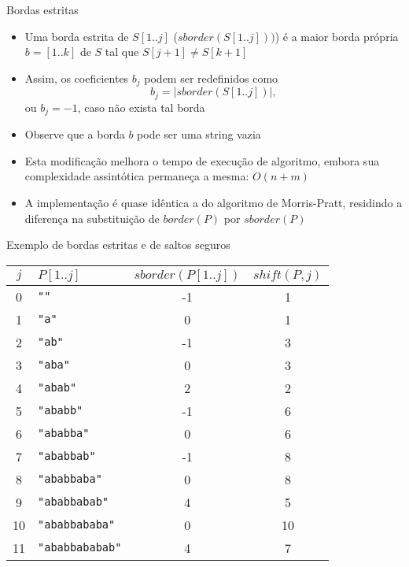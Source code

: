 \begin{frame}[fragile]{Bordas estritas}

    \begin{itemize}
        \item Uma borda estrita de $S[1..j]$ ($sborder(S[1..j]))$) é a maior borda própria 
            $b = [1..k]$ de $S$ tal que $S[j + 1] \neq S[k + 1]$

        \item Assim, os coeficientes $b_j$ podem ser redefinidos como
        \[
            b_j = |sborder(S[1..j])|,
        \]
        ou $b_j = -1$, caso não exista tal borda

        \item Observe que a borda $b$ pode ser uma string vazia

        \item Esta modificação melhora o tempo de execução de algoritmo, embora sua 
            complexidade assintótica permaneça a mesma: $O(n + m)$

        \item A implementação é quase idêntica a do algoritmo de Morris-Pratt, residindo a 
            diferença na substituição de $border(P)$ por $sborder(P)$

    \end{itemize}

\end{frame}

\begin{frame}[fragile]{Exemplo de bordas estritas e de saltos seguros}

    \begin{center}
    \begin{tabularx}{0.9\textwidth}{cXcc}
        \toprule
        $j$ & $P[1..j]$ & $sborder(P[1..j])$ & $shift(P, j)$ \\
        \midrule
            0&\textcolor{red!70}{\verb|""|}&-1&1\\
            1&\textcolor{red!70}{\verb|"a"|}&0&1\\
            2&\textcolor{red!70}{\verb|"ab"|}&-1&3\\
            3&\textcolor{red!70}{\verb|"aba"|}&0&3\\
            4&\textcolor{red!70}{\verb|"abab"|}&2&2\\
            5&\textcolor{red!70}{\verb|"ababb"|}&-1&6\\
            6&\textcolor{red!70}{\verb|"ababba"|}&0&6\\
            7&\textcolor{red!70}{\verb|"ababbab"|}&-1&8\\
            8&\textcolor{red!70}{\verb|"ababbaba"|}&0&8\\
            9&\textcolor{red!70}{\verb|"ababbabab"|}&4&5\\
            10&\textcolor{red!70}{\verb|"ababbababa"|}&0&10\\
            11&\textcolor{red!70}{\verb|"ababbababab"|}&4&7\\
        \bottomrule
    \end{tabularx}
    \end{center}

\end{frame}

